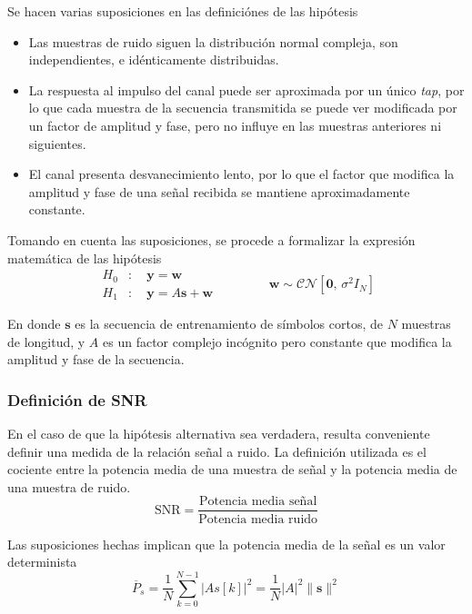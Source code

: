 Se hacen varias suposiciones en las definiciónes de las hipótesis
\begin{itemize}
    \item Las muestras de ruido siguen la distribución normal compleja, son independientes, e idénticamente distribuidas. 
    \item La respuesta al impulso del canal puede ser aproximada por un único \textit{tap}, por lo que cada muestra de la secuencia transmitida se puede ver modificada por un factor de amplitud y fase, pero no influye en las muestras anteriores ni siguientes.
    \item El canal presenta desvanecimiento lento, por lo que el factor que modifica la amplitud y fase de una señal recibida se mantiene aproximadamente constante.
\end{itemize}

Tomando en cuenta las suposiciones, se procede a formalizar la expresión matemática de las hipótesis
\begin{equation}\label{eq:def-hipótesis}
    \begin{aligned}
        H_0&: \quad \mathbf{y} = \mathbf{w}\\
        H_1&: \quad \mathbf{y} = A\mathbf{s} + \mathbf{w}
    \end{aligned}
    \qquad\qquad
    \mathbf{w} \sim \mathcal{CN}\left[\mathbf{0},\, \sigma^2 I_N\right]
\end{equation}

En donde $\mathbf{s}$ es la secuencia de entrenamiento de símbolos cortos, de $N$ muestras de longitud, y $A$ es un factor complejo incógnito pero constante que modifica la amplitud y fase de la secuencia.	

\subsubsection{Definición de SNR}

En el caso de que la hipótesis alternativa sea verdadera, resulta conveniente definir una medida de la relación señal a ruido. La definición utilizada es el cociente entre la potencia media de una muestra de señal y la potencia media de una muestra de ruido.
\begin{equation}\label{eq:snr-definicion}
\text{SNR} = \frac{\text{Potencia media señal}}{\text{Potencia media ruido}}
\end{equation}

Las suposiciones hechas implican que la potencia media de la señal es un valor determinista
\begin{equation}\label{eq:potencia-señal}
\overline{P}_s = \frac{1}{N}\sum_{k=0}^{N-1}\lvert A s[k] \rvert^2 = \frac{1}{N} \lvert A \rvert^2 \lVert \mathbf{s} \rVert^2
\end{equation}

